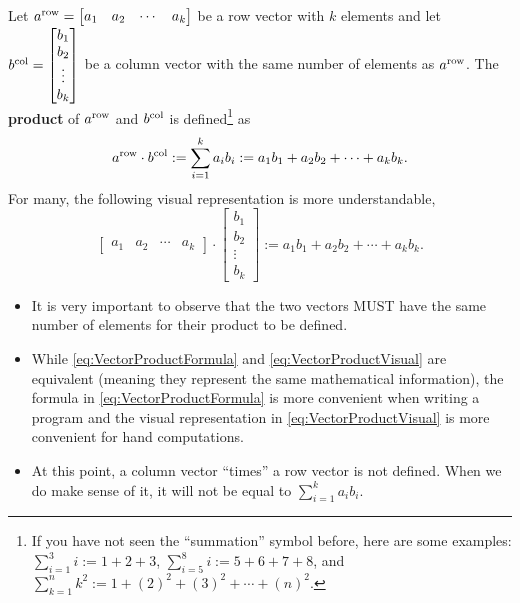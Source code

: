 Let $a^{\rm row}=\begin{bmatrix} a_1 & a_2 & \cdots & a_k \end{bmatrix}$ be a row vector with $k$ elements and let $b^{\rm col}= \begin{bmatrix} b_1 \\b_2 \\ \vdots \\b_k \end{bmatrix}$ be a column vector with the same number of elements as $a^{\rm row}$. The \textbf{product} of $a^{\rm row}$ and $b^{\rm col}$ is defined\footnote{If you have not seen the ``summation'' symbol before, here are some examples: $\sum_{i=1}^3 i:= 1 + 2 + 3$, $\sum_{i=5}^8 i:= 5 + 6 + 7 + 8$, and $\sum_{k=1}^n k^2:= 1 + (2)^2 + (3)^2 + \cdots + (n)^2.$} as 
\begin{equation}
\label{eq:VectorProductFormula}
    a^{\rm row} \cdot b^{\rm col}:= \sum_{i=1}^k a_i b_i := a_1 b_1 + a_2 b_2 + \cdots + a_k b_k.
\end{equation}
For many, the following visual representation is more understandable,
\begin{equation}
\label{eq:VectorProductVisual}
   \begin{bmatrix} a_1 & a_2 & \cdots & a_k \end{bmatrix} \cdot \begin{bmatrix} b_1 \\b_2 \\ \vdots \\b_k \end{bmatrix}:= a_1 b_1 + a_2 b_2 + \cdots + a_k b_k.
\end{equation}

\begin{tcolorbox}[title=\textbf{Remarks on Multiplying a Row Vector Times a Column Vector}]

\begin{itemize}
    \item It is very important to observe that the two vectors MUST have the same number of elements for their product to be defined.
    \item While \eqref{eq:VectorProductFormula} and \eqref{eq:VectorProductVisual} are equivalent (meaning they represent the same mathematical information), the formula in \eqref{eq:VectorProductFormula} is more convenient when writing a program and the visual representation in \eqref{eq:VectorProductVisual} is more convenient for hand computations.
    \item At this point, a column vector ``times'' a  row vector is not defined. When we do make sense of it, it will not be equal to $\sum_{i=1}^k a_i b_i.$
\end{itemize}

\end{tcolorbox} 

